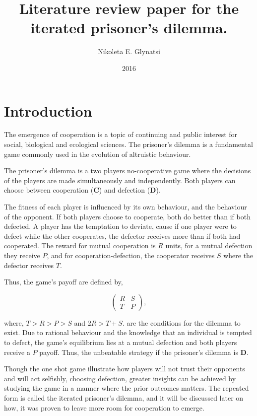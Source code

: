 \documentclass{article}
\title{Literature review paper for the iterated prisoner's dilemma.}
\author{Nikoleta E. Glynatsi}
\date{2016}
\begin{document}
\maketitle

\section{Introduction}\label{section:introduction}

The emergence of cooperation is a topic of continuing and public interest
for social, biological and ecological sciences. The prisoner's dilemma is a 
fundamental game commonly used in the evolution of altruistic
behaviour.

The prisoner's dilemma is a two players no-cooperative game where the decisions
of the players are made simultaneously and independently. Both players can
choose between cooperation (\textbf{C}) and defection (\textbf{D}).

The fitness of each player is influenced by its own behaviour, and the behaviour
of the opponent. If both players choose to cooperate, both do better
than if both defected. A player has the temptation to deviate, cause if one
player were to defect while the other cooperates, the defector receives
more than if both had cooperated. The reward for mutual cooperation is \(R\)
units, for a mutual defection they receive \(P\), and for cooperation-defection,
the cooperator receives \(S\) where the defector receives \(T\).

Thus, the game's payoff are  defined by,

\begin{equation} \label{eq:the_pd_payoffs}
	\begin{pmatrix} 
	R & S \\ T & P
	\end{pmatrix},
\end{equation}

where,  \(T > R > P > S \) and \(2R > T + S.\) are the conditions for the dilemma
to exist. Due to rational behaviour and the knowledge that an individual is tempted 
to defect, the game's equilibrium lies at a mutual defection and both players 
receive a \(P\) payoff. Thus, the unbeatable strategy if the prisoner's dilemma 
is \textbf{D}.

Though the one shot game illustrate how  players will not trust their opponents
and  will act selfishly, choosing defection, greater insights can be achieved by 
studying the game in a manner where the prior outcomes matters. The 
repeated form is called the iterated prisoner's dilemma, and it will be discussed
later on how, it was proven to leave more room for cooperation to emerge. 
\end{document}
